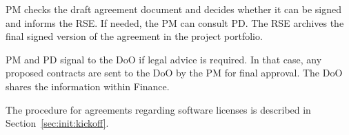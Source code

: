 PM checks the draft agreement document and decides whether it can be signed and informs the RSE. If needed, the PM can
consult PD. The RSE archives the final signed version of the agreement in the project portfolio.

PM and PD signal to the DoO if legal advice is required. In that case, any proposed contracts are sent to the DoO by the
PM for final approval. The DoO shares the information within Finance.

The procedure for agreements regarding software licenses is described in Section~\ref{sec:init:kickoff}.
